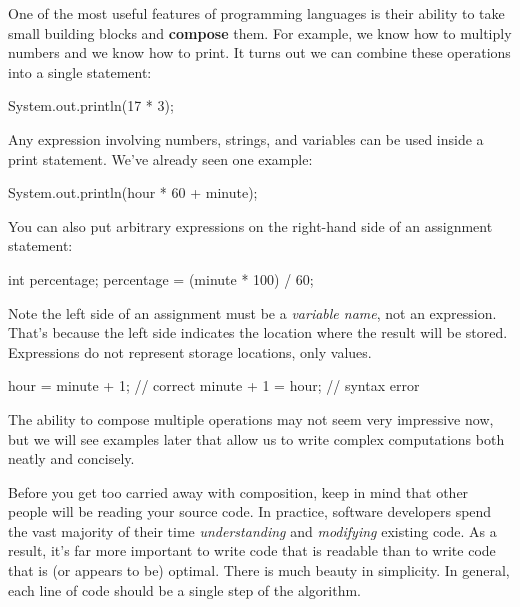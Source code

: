 One of the most useful features of programming languages is their ability to take small building blocks and {\bf compose} them.
For example, we know how to multiply numbers and we know how to print.
It turns out we can combine these operations into a single statement:

\begin{code}
    System.out.println(17 * 3);
\end{code}

Any expression involving numbers, strings, and variables can be used inside a print statement.
We've already seen one example:

\begin{code}
    System.out.println(hour * 60 + minute);
\end{code}

You can also put arbitrary expressions on the right-hand side of an assignment statement:

\begin{code}
    int percentage;
    percentage = (minute * 100) / 60;
\end{code}

Note the left side of an assignment must be a {\em variable name}, not an expression.
That's because the left side indicates the location where the result will be stored.
Expressions do not represent storage locations, only values.

\begin{code}
    hour = minute + 1;  // correct
    minute + 1 = hour;  // syntax error
\end{code}


The ability to compose multiple operations may not seem very impressive now, but we will see examples later that allow us to write complex computations both neatly and concisely.

Before you get too carried away with composition, keep in mind that other people will be reading your source code.
In practice, software developers spend the vast majority of their time {\em understanding} and {\em modifying} existing code.
As a result, it's far more important to write code that is readable than to write code that is (or appears to be) optimal.
There is much beauty in simplicity.
In general, each line of code should be a single step of the algorithm.
